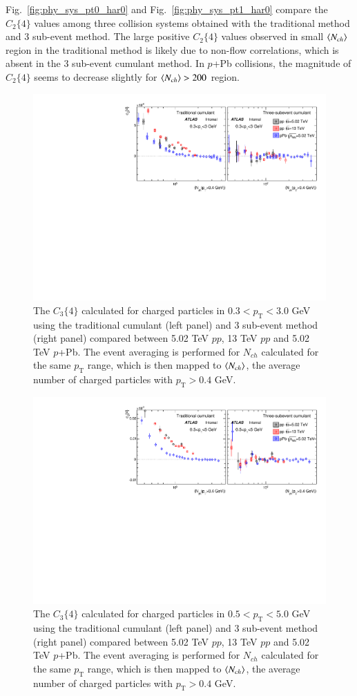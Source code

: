 Fig.~\ref{fig:phy_sys_pt0_har0} and Fig.~\ref{fig:phy_sys_pt1_har0} compare the $C_{2}\{4\}$ values among three collision systems obtained with the traditional method and 3 sub-event method. The large positive $C_{2}\{4\}$ values observed in small $\left\langle N_{ch}\right\rangle$ region in the traditional method is likely due to non-flow correlations, which is absent in the 3 sub-event cumulant method. In $p$+Pb collisions, the magnitude of $C_{2}\{4\}$ seems to decrease slightly for $\left\langle N_{ch}\right\rangle>200$ region.

\begin{figure}[H]
\centering
\includegraphics[width=0.8\linewidth]{figs/sec_result/phy_sys_pt0_har1.pdf}
\caption{The $C_{3}\{4\}$ calculated for charged particles in $0.3<p_{\text{T}}<3.0$ GeV using the traditional cumulant (left panel) and 3 sub-event method (right panel) compared between 5.02 TeV $pp$, 13 TeV $pp$ and 5.02 TeV $p$+Pb. The event averaging is performed for $N_{ch}$ calculated for the same $p_{\text{T}}$ range, which is then mapped to $\left\langle N_{ch}\right\rangle$, the average number of charged particles with $p_{\text{T}}>0.4$ GeV.}
\label{fig:phy_sys_pt0_har1}
\end{figure}
\begin{figure}[H]
\centering
\includegraphics[width=0.8\linewidth]{figs/sec_result/phy_sys_pt1_har1.pdf}
\caption{The $C_{3}\{4\}$ calculated for charged particles in $0.5<p_{\text{T}}<5.0$ GeV using the traditional cumulant (left panel) and 3 sub-event method (right panel) compared between 5.02 TeV $pp$, 13 TeV $pp$ and 5.02 TeV $p$+Pb. The event averaging is performed for $N_{ch}$ calculated for the same $p_{\text{T}}$ range, which is then mapped to $\left\langle N_{ch}\right\rangle$, the average number of charged particles with $p_{\text{T}}>0.4$ GeV.}
\label{fig:phy_sys_pt1_har1}
\end{figure}
